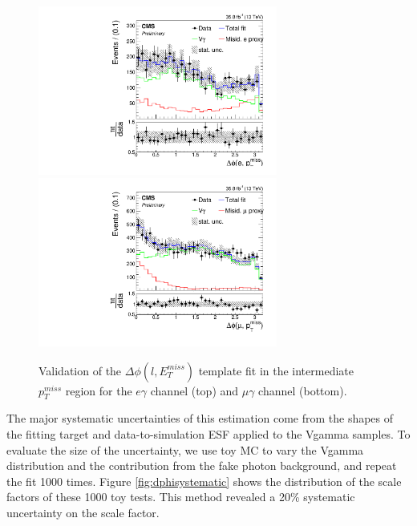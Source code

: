 \documentclass[thesis.tex]{subfiles}
\renewcommand\_{\textunderscore\allowbreak}
\begin{document}
\begin{figure}[hbtp]
  \centering
    \includegraphics[width=0.7\textwidth]{Fig/fit_dPhi_eg_MET120.pdf} \\
    \includegraphics[width=0.7\textwidth]{Fig/fit_dPhi_mg_MET120.pdf}
  \caption{Validation of the $\Delta\phi(l,E_{T}^{miss})$ template fit in the intermediate $p_T^{miss}$ region for the $e\gamma$ channel (top) and $\mu\gamma$ channel (bottom).}
    \label{fig:checkdPhi}
\end{figure}

The major systematic uncertainties of this estimation come from the shapes of the fitting target and data-to-simulation ESF applied to the Vgamma samples. To evaluate the size of the uncertainty, we use toy MC to vary the Vgamma distribution and the contribution from the fake photon background, and 
repeat the fit 1000 times. Figure \ref{fig:dphisystematic} shows the distribution of the scale factors of these 1000 toy tests. This method revealed a 20\% systematic uncertainty on the scale factor.
\end{document}
